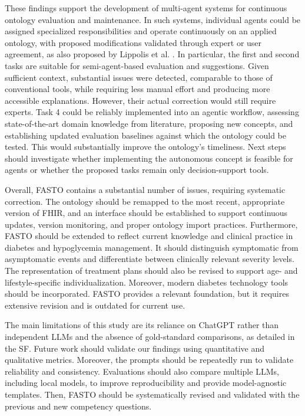 \documentclass[
]{ceurart}
\begin{document}
These findings support the development of multi-agent systems for continuous ontology evaluation and maintenance. In such systems, individual agents could be assigned specialized responsibilities and operate continuously on an applied ontology, with proposed modifications validated through expert or user agreement, as also proposed by Lippolis et al. \cite{Lippolis2025}.
In particular, the first and second tasks are suitable for semi-agent-based evaluation and suggestions. Given sufficient context, substantial issues were detected, comparable to those of conventional tools, while requiring less manual effort and producing more accessible explanations. However, their actual correction would still require experts. Task 4 could be reliably implemented into an agentic workflow, assessing state-of-the-art domain knowledge from literature, proposing new concepts, and establishing updated evaluation baselines against which the ontology could be tested. This would substantially improve the ontology's timeliness. Next steps should investigate whether implementing the autonomous concept is feasible for agents or whether the proposed tasks remain only decision-support tools. 

Overall, FASTO contains a substantial number of issues, requiring systematic correction. The ontology should be remapped to the most recent, appropriate version of FHIR, and an interface should be established to support continuous updates, version monitoring, and proper ontology import practices. Furthermore, FASTO should be extended to reflect current knowledge and clinical practice in diabetes and hypoglycemia management. It should distinguish symptomatic from asymptomatic events and differentiate between clinically relevant severity levels. The representation of treatment plans should also be revised to support age- and lifestyle-specific individualization. Moreover, modern diabetes technology tools should be incorporated. FASTO provides a relevant foundation, but it requires extensive revision and is outdated for current use. 

The main limitations of this study are its reliance on ChatGPT rather than independent LLMs and the absence of gold-standard comparisons, as detailed in the SF. Future work should validate our findings using quantitative and qualitative metrics. Moreover, the prompts should be repeatedly run to validate reliability and consistency. Evaluations should also compare multiple LLMs, including local models, to improve reproducibility and provide model-agnostic templates. Then, FASTO should be systematically revised and validated with the previous and new competency questions. 
\end{document}
